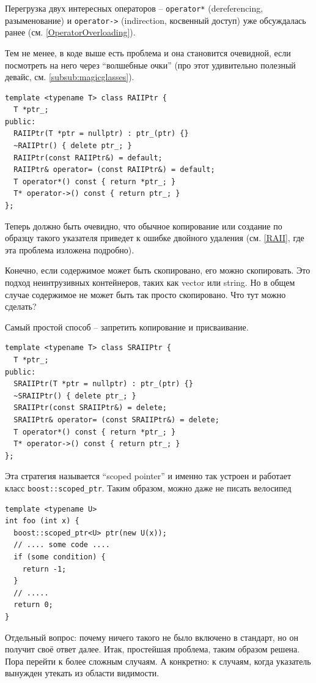 \documentclass[a4paper,12pt,oneside]{book}
\begin{document}
Перегрузка двух интересных операторов -- \lstinline!operator*! (dereferencing, разыменование) и \lstinline!operator->! (indirection, косвенный доступ) уже обсуждалась ранее (см. \ref{OperatorOverloading}).

Тем не менее, в коде выше есть проблема и она становится очевидной, если посмотреть на него через ``волшебные очки'' (про этот удивительно полезный девайс, см. \ref{subsub:magicglasses}).

\begin{lstlisting}
template <typename T> class RAIIPtr {
  T *ptr_;
public:
  RAIIPtr(T *ptr = nullptr) : ptr_(ptr) {}
  ~RAIIPtr() { delete ptr_; }
  RAIIPtr(const RAIIPtr&) = default;
  RAIIPtr& operator= (const RAIIPtr&) = default;
  T operator*() const { return *ptr_; }
  T* operator->() const { return ptr_; }
};
\end{lstlisting}

Теперь должно быть очевидно, что обычное копирование или создание по образцу такого указателя приведет к ошибке двойного удаления (см. \ref{RAII}, где эта проблема изложена подробно). 

Конечно, если содержимое может быть скопировано, его можно скопировать. Это подход неинтрузивных контейнеров, таких как vector или string. Но в общем случае содержимое не может быть так просто скопировано. Что тут можно сделать? 

Самый простой способ -- запретить копирование и присваивание. 

\begin{lstlisting}
template <typename T> class SRAIIPtr {
  T *ptr_;
public:
  SRAIIPtr(T *ptr = nullptr) : ptr_(ptr) {}
  ~SRAIIPtr() { delete ptr_; }
  SRAIIPtr(const SRAIIPtr&) = delete;
  SRAIIPtr& operator= (const SRAIIPtr&) = delete;
  T operator*() const { return *ptr_; }
  T* operator->() const { return ptr_; }
};
\end{lstlisting}

Эта стратегия называется ``scoped pointer'' и именно так устроен и работает класс \lstinline!boost::scoped_ptr!. Таким образом, можно даже не писать велосипед

\begin{lstlisting}
template <typename U>
int foo (int x) {
  boost::scoped_ptr<U> ptr(new U(x));
  // .... some code ....
  if (some condition) {
    return -1;
  }
  // .....
  return 0;
}
\end{lstlisting}

Отдельный вопрос: почему ничего такого не было включено в стандарт, но он получит своё ответ далее. Итак, простейшая проблема, таким образом решена. Пора перейти к более сложным случаям. А конкретно: к случаям, когда указатель вынужден утекать из области видимости.
\end{document}
